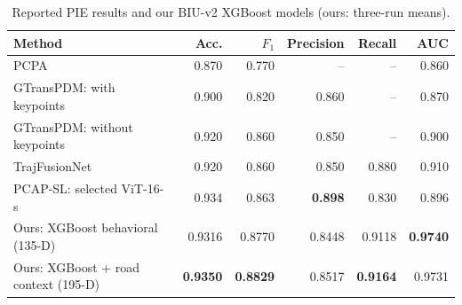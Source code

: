 \begin{table}[htbp]
\centering
\caption{Reported PIE results and our BIU-v2 XGBoost models (ours: three-run means).}\label{tab:ch4_literature_pie}
\begin{tabularx}{\textwidth}{@{}Xrrrrr@{}}\toprule
\textbf{Method} & \textbf{Acc.} & \textbf{\boldmath $F_1$} & \textbf{Precision} & \textbf{Recall} & \textbf{AUC} \\[3pt]
\midrule
PCPA~\cite{Kotseruba2021Benchmark} & 0.870 & 0.770 & -- & -- & 0.860\\[3pt]
GTransPDM: with keypoints~\cite{Xie2025GTransPDM} & 0.900 & 0.820 & 0.860 & -- & 0.870\\[3pt]
GTransPDM: without keypoints~\cite{Xie2025GTransPDM} & 0.920 & 0.860 & 0.850 & -- & 0.900\\[3pt]
TrajFusionNet~\cite{Landry2025TrajFusionNet} & 0.920 & 0.860 & 0.850 & 0.880 & 0.910\\[3pt]
PCAP-SL: selected ViT-16-s~\cite{Benkabou2026PCAPSL} & 0.934 & 0.863 & \textbf{0.898} & 0.830 & 0.896\\[3pt]
\midrule
Ours: XGBoost behavioral (\mbox{135-D}) & 0.9316 & 0.8770 & 0.8448 & 0.9118 & \textbf{0.9740}\\[3pt]
Ours: XGBoost + road context (\mbox{195-D}) & \textbf{0.9350} & \textbf{0.8829} & 0.8517 & \textbf{0.9164} & 0.9731\\[3pt]
\bottomrule
\end{tabularx}
\end{table}
